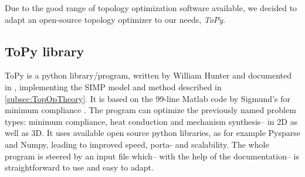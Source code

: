 Due to the good range of topology optimization software available, we decided to adapt an open-source topology optimizer to our needs, \emph{ToPy}.

\subsection{ToPy library}\label{sec:ToPy}
ToPy \cite{ToPy} is a python library/program, written by William Hunter and documented in \cite{Hunter2009}, implementing the SIMP model and method described in \autoref{subsec:TopOpTheory}. It is based on the 99-line Matlab code by Sigmund's for minimum compliance \cite{sigmund200199}. The program can optimize the previously named problem types: minimum compliance, heat conduction and mechanism synthesis-- in 2D as well as 3D. It uses available open source python libraries, as for example Pysparse and Numpy, leading to improved speed, porta- and scalability. The whole program is steered by an input file which-- with the help of the documentation-- is straightforward to use and easy to adapt. %

